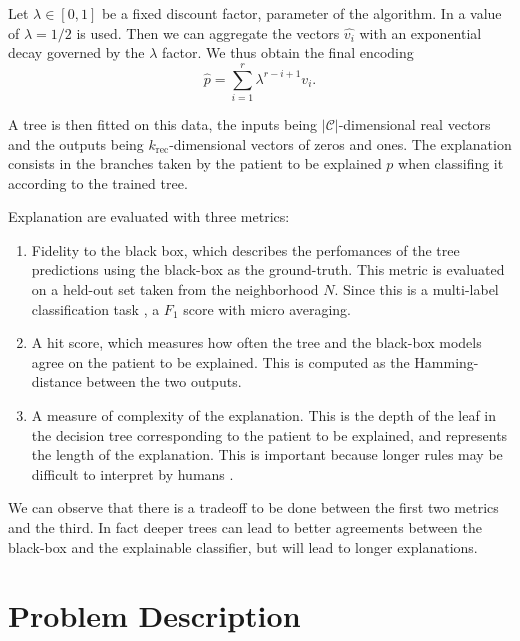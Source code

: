\documentclass[]{marticle}
\newcommand{\codes}{\mathcal{C}}
\begin{document}
Let $\lambda\in [0,1]$ be a fixed discount factor, parameter of the algorithm. In
\cite{panigutti-xai} a value of $\lambda = 1/2$ is used. Then we can aggregate the vectors
$\hat{v_i}$ with an exponential decay governed by the $\lambda$ factor. We thus obtain the final
encoding
\begin{equation*}
    \hat{p} = \sum_{i=1}^r \lambda^{r-i+1} v_i.
\end{equation*}

A tree is then fitted on this data, the inputs being $|\codes|$-dimensional real vectors and the
outputs being $k_\text{rec}$-dimensional vectors of zeros and ones. The explanation consists in the
branches taken by the patient to be explained $p$ when classifing it according to the trained tree.

Explanation are evaluated with three metrics:
\begin{enumerate}
\item Fidelity to the black box, which describes the perfomances of the tree predictions using the
black-box as the ground-truth. This metric is evaluated on a held-out set taken from the
neighborhood $N$. Since this is a multi-label classification task \cite{paper-multi-label}, a $F_1$
score with micro averaging.

\item A hit score, which measures how often the tree and the black-box models agree on the patient
to be explained. This is computed as the Hamming-distance between the two outputs.

\item A measure of complexity of the explanation. This is the depth of the leaf in the decision tree
corresponding to the patient to be explained, and represents the length of the explanation. This is
important because longer rules may be difficult to interpret by humans \cite{paper-lipton}.
\end{enumerate}

We can observe that there is a tradeoff to be done between the first two metrics and the third. In
fact deeper trees can lead to better agreements between the black-box and the explainable
classifier, but will lead to longer explanations.


\section{Problem Description}
\end{document}
